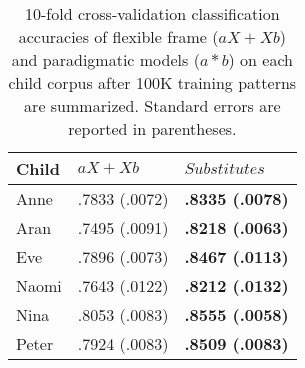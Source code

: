 \begin{table}[ht]
\centering
\caption{10-fold cross-validation classification accuracies of flexible frame
  ($aX + Xb$) and paradigmatic models ($a*b$) on each child corpus after 100K
  training patterns are summarized.  Standard errors are reported in
  parentheses.
}
\begin{tabular}{|l|l|l|}
  \hline
  Child & $aX + Xb$ & $Substitutes$\\
  \hline
  Anne  & .7833 (.0072) & {\bf .8335 (.0078)} \\
  Aran  & .7495 (.0091) & {\bf .8218 (.0063)} \\
  Eve   & .7896 (.0073) & {\bf .8467 (.0113)} \\
  Naomi & .7643 (.0122) & {\bf .8212 (.0132)} \\
  Nina  & .8053 (.0083) & {\bf .8555 (.0058)} \\
  Peter & .7924 (.0083) & {\bf .8509 (.0083)} \\
  \hline
\end{tabular}
\label{t:framevssub}
\end{table}


